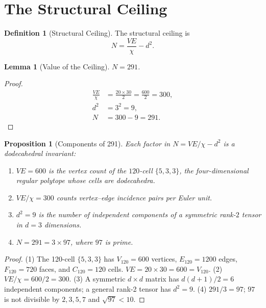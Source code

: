 \documentclass[11pt,a4paper]{article}
\theoremstyle{plain}
\newtheorem{lemma}[theorem]{Lemma}
\newtheorem{proposition}[theorem]{Proposition}
\theoremstyle{definition}
\newtheorem{definition}[theorem]{Definition}
\begin{document}
\section{The Structural Ceiling}\label{sec:ceiling}

\begin{definition}[Structural Ceiling]\label{def:ceiling}
The structural ceiling is
\[
  N = \frac{VE}{\chi} - d^2.
\]
\end{definition}

\begin{lemma}[Value of the Ceiling]\label{lem:ceiling}
$N = 291$.
\end{lemma}

\begin{proof}
\begin{align*}
  \frac{VE}{\chi} &= \frac{20 \times 30}{2} = \frac{600}{2} = 300, \\
  d^2 &= 3^2 = 9, \\
  N &= 300 - 9 = 291.
\end{align*}
\end{proof}

\begin{proposition}[Components of 291]\label{prop:291}
Each factor in $N = VE/\chi - d^2$ is a dodecahedral invariant:
\begin{enumerate}[nosep]
  \item $VE = 600$ is the vertex count of the $120$-cell $\{5,3,3\}$,
    the four-dimensional regular polytope whose cells are dodecahedra.
  \item $VE/\chi = 300$ counts vertex--edge incidence pairs per Euler unit.
  \item $d^2 = 9$ is the number of independent components of a symmetric
    rank-$2$ tensor in $d = 3$ dimensions.
  \item $N = 291 = 3 \times 97$, where $97$ is prime.
\end{enumerate}
\end{proposition}

\begin{proof}
(1) The 120-cell $\{5,3,3\}$ has $V_{120} = 600$ vertices, $E_{120} = 1200$
edges, $F_{120} = 720$ faces, and $C_{120} = 120$ cells.
$VE = 20 \times 30 = 600 = V_{120}$.
(2) $VE/\chi = 600/2 = 300$.
(3) A symmetric $d \times d$ matrix has $d(d+1)/2 = 6$ independent
components; a general rank-2 tensor has $d^2 = 9$.
(4) $291/3 = 97$; $97$ is not divisible by $2,3,5,7$ and $\sqrt{97} < 10$.
\end{proof}
\end{document}
